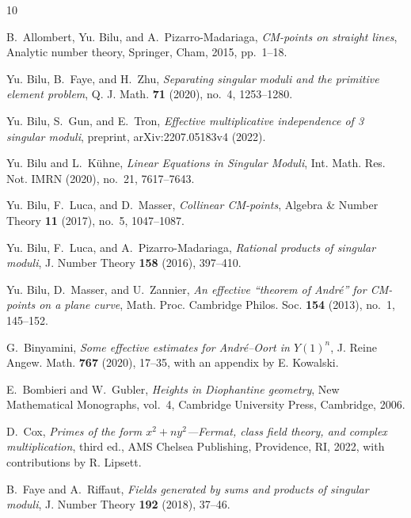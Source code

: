 \documentclass[11pt,a4paper, british]{amsart}
\theoremstyle{definition}
\theoremstyle{remark}
\numberwithin{equation}{section}
\begin{document}
	
	\begin{thebibliography}{10}
		
		B.~Allombert, Yu. Bilu, and A.~Pizarro-Madariaga, \emph{C{M}-points on straight
			lines}, Analytic number theory, Springer, Cham, 2015, pp.~1--18.
		
		Yu. Bilu, B.~Faye, and H.~Zhu, \emph{Separating singular moduli and the
			primitive element problem}, Q. J. Math. \textbf{71} (2020), no.~4,
		1253--1280.
		
		Yu. Bilu, S.~Gun, and E.~Tron, \emph{Effective multiplicative independence of 3
			singular moduli}, preprint, arXiv:2207.05183v4 (2022).
		
		Yu. Bilu and L.~K\"{u}hne, \emph{Linear {E}quations in {S}ingular {M}oduli},
		Int. Math. Res. Not. IMRN (2020), no.~21, 7617--7643.
		
		Yu. Bilu, F.~Luca, and D.~Masser, \emph{Collinear {CM}-points}, Algebra \&
		Number Theory \textbf{11} (2017), no.~5, 1047--1087.
		
		Yu. Bilu, F.~Luca, and A.~Pizarro-Madariaga, \emph{Rational products of
			singular moduli}, J. Number Theory \textbf{158} (2016), 397--410.
		
		Yu. Bilu, D.~Masser, and U.~Zannier, \emph{An effective ``theorem of
			{A}ndr\'{e}'' for {CM}-points on a plane curve}, Math. Proc. Cambridge
		Philos. Soc. \textbf{154} (2013), no.~1, 145--152.
		
		G.~Binyamini, \emph{Some effective estimates for {A}ndr\'{e}--{O}ort in
			{$Y(1)^n$}}, J. Reine Angew. Math. \textbf{767} (2020), 17--35, with an
		appendix by E. Kowalski.
		
		E.~Bombieri and W.~Gubler, \emph{Heights in {D}iophantine geometry}, New
		Mathematical Monographs, vol.~4, Cambridge University Press, Cambridge, 2006.
		
		D.~Cox, \emph{Primes of the form {$x^2+ny^2$}---{F}ermat, class field theory,
			and complex multiplication}, third ed., AMS Chelsea Publishing, Providence,
		RI, 2022, with contributions by R. Lipsett.
		
		B.~Faye and A.~Riffaut, \emph{Fields generated by sums and products of singular
			moduli}, J. Number Theory \textbf{192} (2018), 37--46.
		

\end{thebibliography}
\end{document}
